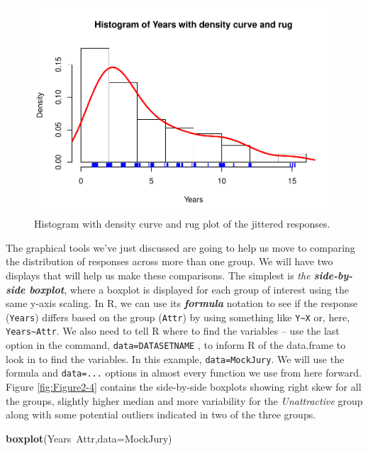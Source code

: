 \documentclass[]{book}
\newenvironment{Shaded}{\begin{snugshade}}{\end{snugshade}}
\newcommand{\KeywordTok}[1]{\textcolor[rgb]{0.13,0.29,0.53}{\textbf{{#1}}}}
\newcommand{\DataTypeTok}[1]{\textcolor[rgb]{0.13,0.29,0.53}{{#1}}}
\newcommand{\NormalTok}[1]{{#1}}
\begin{document}
\begin{figure}[htbp]
\centering
\includegraphics{GreenwoodBanner_files/figure-latex/Figure2-3-1.pdf}
\caption{\label{fig:Figure2-3}Histogram with density curve and rug plot of the jittered
responses.}
\end{figure}

The graphical tools we've just discussed are going to help us move to
comparing the distribution of responses across more than one group. We
will have two displays that will help us make these comparisons. The
simplest is \emph{the \textbf{side-by-side boxplot}}, where a boxplot is
displayed for each group of interest using the same y-axis scaling. In
R, we can use its \textbf{\emph{formula}} notation to see if the
response (\texttt{Years}) differs based on the group (\texttt{Attr}) by
using something like \texttt{Y\textasciitilde{}X} or, here,
\texttt{Years\textasciitilde{}Attr}. We also need to tell R where to
find the variables -- use the last option in the command,
\texttt{data=DATASETNAME} , to inform R of the data.frame to look in to
find the variables. In this example, \texttt{data=MockJury}. We will use
the formula and \texttt{data=...} options in almost every function we
use from here forward. Figure \ref{fig:Figure2-4} contains the
side-by-side boxplots showing right skew for all the groups, slightly
higher median and more variability for the \emph{Unattractive} group
along with some potential outliers indicated in two of the three groups.



\begin{Shaded}
\begin{Highlighting}[]
\KeywordTok{boxplot}\NormalTok{(Years~Attr,}\DataTypeTok{data=}\NormalTok{MockJury)}
\end{Highlighting}
\end{Shaded}
\end{document}
